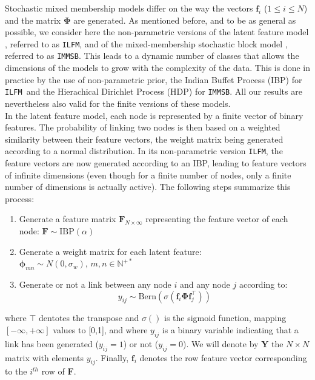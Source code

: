 \documentclass[conference]{IEEEtran}
\newcommand{\ifm}{\texttt{ILFM}}
\newcommand{\imb}{\texttt{IMMSB}}
\newcommand{\IBP}{\mathrm{IBP}}
\newcommand{\mat}[1]{\mathbf{#1}}
\begin{document}
Stochastic mixed membership models differ on the way the vectors $\mat{f}_{i}$ ($1 \le i \le N$) and the matrix $\mat{\Phi}$ are generated. As mentioned before, and to be as general as possible, we consider here the non-parametric versions of the latent feature model \cite{ILFRM}, referred to as \ifm, and of the mixed-membership stochastic block model \cite{iMMSB,fan2015dynamic}, referred to as \imb. This leads to a dynamic number of classes that allows the dimensions of the models to grow with the complexity of the data. This is done in practice by the use of non-parametric prior,  the Indian Buffet Process (IBP) for \ifm\ and the Hierachical Dirichlet Process (HDP)  for \imb. All our results are nevertheless also valid for the finite versions of these models.~\\

In the latent feature model, each node is represented by a finite vector of binary features. The probability of linking two nodes is then based on a weighted similarity between their feature vectors, the weight matrix being generated according to a normal distribution. In its non-parametric version \ifm, the feature vectors are now generated according to an IBP, leading to feature vectors of infinite dimensions (even though for a finite number of nodes, only a finite number of dimensions is actually active). The following steps summarize this process:~\\
%
\begin{enumerate}
\item Generate a feature matrix $\mat{F}_{N \times \infty}$ representing the feature vector of each node: $\mat{F} \sim \IBP(\alpha)$
\item Generate a weight matrix for each latent feature:\\
 $\mat{\phi}_{mn} \sim N(0, \sigma_w), \, m,n \in \mathbb{N}^{+*}$
\item Generate or not a link between any node $i$ and any node $j$ according to: 
%
\begin{equation*}
y_{ij} \sim \mathrm{Bern}(\sigma(\mat{f}_{i} \mat{\Phi} \mat{f}_{j}^\top))
\label{eq:link-ilfm}
\end{equation*}
\end{enumerate}
%
where $\top$ dentotes the transpose and  $\sigma()$ is the sigmoid function, mapping $[-\infty, +\infty]$ values to [0,1], and where $y_{ij}$ is a binary variable indicating that a link has been generated ($y_{ij}=1$) or not ($y_{ij}=0$). We will denote by $\mat{Y}$ the $N \times N$ matrix with elements $y_{ij}$. Finally, $\mat{f}_{i}$ denotes the row feature vector corresponding to the $i^{th}$ row of $\mat{F}$.
\end{document}
